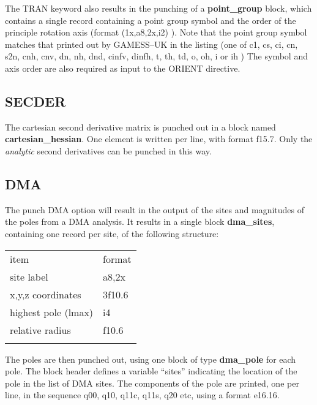 \documentclass[11pt,fleqn]{article}
\begin{document}
The TRAN keyword also results in the punching of a {\bf point\_group} block, which contains
a single record containing a point group symbol and the order of the principle rotation
axis (format (1x,a8,2x,i2) ). Note that the point group symbol matches that printed
out by GAMESS--UK in the listing
(one of c1, cs, ci, cn, s2n, cnh, cnv, dn, nh, dnd, cinfv, dinfh, t, th, td, o, oh, i or ih )
The symbol and axis order are also required as input to the ORIENT directive.

\subsection[SECDER]{SECDER}

  The cartesian second derivative matrix is punched out in a block
named {\bf cartesian\_hessian}. One element is written per line, with
format f15.7. Only the {\em analytic} second derivatives can be punched
in this way.

\subsection[DMA]{DMA}

  The punch DMA option will result in the output of the sites and
magnitudes of the poles from a DMA analysis. It results in a single block 
{\bf dma\_sites}, containing one record per site, of the following structure:

 \begin{centering}
 \begin{tabular}{ll}
\\ \hline
  item         & format\\ \cline{1-2}
site label   &  a8,2x \\
x,y,z coordinates  &  3f10.6  \\
highest pole (lmax) &  i4  \\
relative radius     &  f10.6 \\
\hline 
\\
 \end{tabular}

 \end{centering}


The poles are then punched out, using one block of type {\bf dma\_pole}
for each pole. The block header defines a variable ``sites'' indicating
the location of the pole in the list of DMA sites. The components of the pole are 
printed, one per line, in the sequence q00, q10, q11c, q11s, q20 etc,
using a format e16.16.
\end{document}
